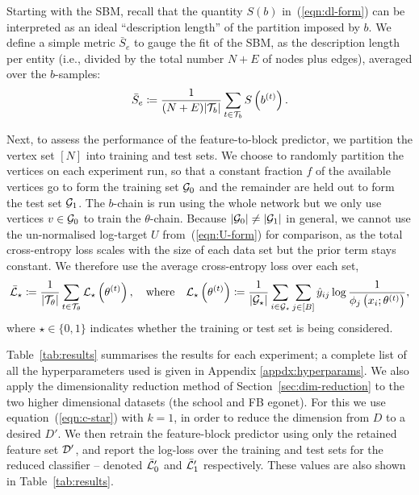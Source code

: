 Starting with the SBM, recall that the quantity $S(b)$ in~(\ref{eqn:dl-form}) 
can be interpreted as an ideal ``description length'' of the partition 
imposed by $b$. We define a simple
metric $\bar{S}_e$ to gauge the fit of the SBM,
as the description length per entity 
(i.e., divided by the total number $N+E$ of 
nodes plus edges),
averaged over the $b$-samples:
%
\begin{equation}
	\bar{S}_e \coloneqq \frac{1}{(N+E) |\mathcal{T}_b|} \sum_{t\in \mathcal{T}_b} S \left( b^{(t)} \right).
	\label{eqn:mean-dl}
\end{equation}
%

Next, to assess the performance of the feature-to-block predictor, 
we partition the vertex set $[N]$ into training and test sets. We choose to 
randomly partition the vertices on each experiment run,
so that a constant fraction $f$ of the available vertices go to form 
the training set $\mathcal{G}_0$ and the remainder are held out to form the
test set $\mathcal{G}_1$.
The $b$-chain is run using the whole network but we only use vertices $v \in \mathcal{G}_0$ to train the $\theta$-chain. Because $|\mathcal{G}_0| \neq |\mathcal{G}_1|$ in general, we cannot use the un-normalised log-target $U$ from~(\ref{eqn:U-form}) for comparison,
as the total cross-entropy loss scales with the size of each data set but 
the prior term stays constant. We therefore use the average cross-entropy loss 
over each set,
%
\begin{equation}
	\bar{\mathcal{L}}_\star \coloneqq \frac{1}{|\mathcal{T}_\theta|} \sum_{t \in \mathcal{T}_\theta} \mathcal{L}_\star \left( \theta^{(t)} \right),
	\quad \textrm{where} \quad
	\mathcal{L}_\star \left( \theta^{(t)} \right) \coloneqq \frac{1}{|\mathcal{G}_\star|} \sum_{i \in \mathcal{G}_\star}\sum_{j \in [B]} \hat{y}_{ij} \log \frac{1}{\phi_j \left(x_i; \theta^{(t)} \right)},
	\label{eqn:cross-entropy-loss}
\end{equation}
%
where $\star \in \{0, 1\}$ indicates whether the training or test
set is being considered.

Table~\ref{tab:results} summarises the results for each experiment;
a complete list of all the hyperparameters used 
is given in Appendix \ref{appdx:hyperparams}. We also apply the 
dimensionality reduction method 
of Section~\ref{sec:dim-reduction}
to the two higher dimensional datasets (the school and FB egonet). 
For this we use equation~(\ref{eqn:c-star}) with $k=1$,
in order to reduce the dimension from 
$D$ to a desired $D'$. 
We then retrain the feature-block predictor using only the retained 
feature set $\mathcal{D}'$, and report the log-loss over the training and 
test sets for the reduced classifier -- 
denoted $\bar{\mathcal{L}}_0'$ and $\bar{\mathcal{L}}_1'$ respectively. 
These values are also shown in Table~\ref{tab:results}.


